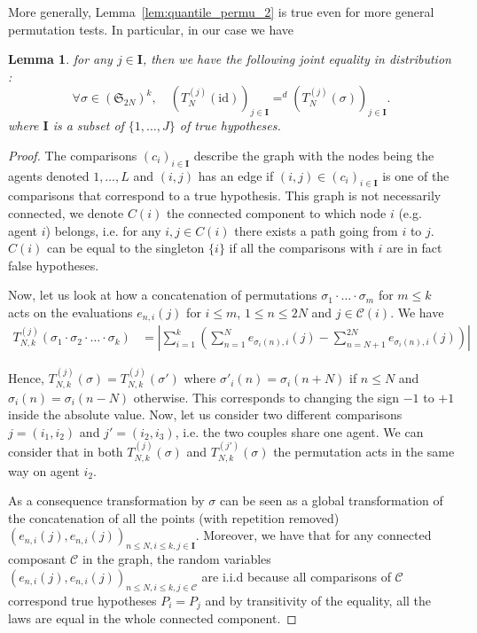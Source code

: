 \documentclass{article}
\theoremstyle{plain}
\newtheorem{Lemma}{Lemma}
\theoremstyle{remark}
\renewcommand{\S}{\mathfrak{S}}
\newcommand{\1}{\mathbbm{1}}
\newcommand{\id}{\mathrm{id}}
\numberwithin{equation}{section}
\begin{document}
More generally, Lemma~\ref{lem:quantile_permu_2} is true even for more general permutation tests. In particular, in our case we have

\begin{Lemma}
for any $j \in \textbf{I}$, then we have the following joint equality in distribution :
$$\forall \sigma \in (\S_{2N})^k, \quad (T_N^{(j)}(\id))_{j \in\textbf{I}} =^d (T_N^{(j)}(\sigma))_{j \in \textbf{I}}.$$
where $\textbf{I}$ is a subset of $\{1,\dots,J\}$ of true hypotheses.
\end{Lemma}
\begin{proof}
The comparisons $(c_i)_{i \in \textbf{I}}$ describe the graph with the nodes being the agents denoted $1,\dots,L$ and $(i,j)$ has an edge if $(i,j)\in(c_i)_{i \in \textbf{I}}$ is one of the comparisons that correspond to a true hypothesis. This graph is not necessarily connected, we denote $C(i)$ the connected component to which node $i$ (e.g. agent $i$) belongs, i.e. for any $i,j \in C(i)$ there exists a path going from $i$ to $j$. $C(i)$ can be equal to the singleton $\{i\}$ if all the comparisons with $i$ are in fact false hypotheses.

Now, let us look at how a concatenation of permutations $\sigma_1\cdot\ldots\cdot\sigma_m$ for $m\le k$ acts on the evaluations $e_{n,i}(j)$ for $i \le m$, $1\le n\le 2N$ and $j \in \mathcal{C}(i)$. We have
\begin{align*}
T_{N,k}^{(j)}(\sigma_1 \cdot  \sigma_2 \cdot  \ldots  \cdot  \sigma_k)&=  \left|\sum_{i=1}^k\left(\sum_{n=1}^{N} e_{\sigma_i(n),i}(j)-\sum_{n=N+1}^{2N} e_{\sigma_i(n),i}(j)\right)\right|
\end{align*}

Hence, $T_{N,k}^{(j)}(\sigma) = T_{N,k}^{(j)}(\sigma')$ where $\sigma'_i(n)=\sigma_i(n+N)$ if $n \le N$ and $\sigma_i(n) = \sigma_i(n-N)$ otherwise. This corresponds to changing the sign $-1$ to $+1$ inside the absolute value. Now, let us consider two different comparisons $j=(i_1,i_2)$ and $j'=(i_2,i_3)$, i.e. the two couples share one agent. We can consider that in both $T_{N,k}^{(j)}(\sigma)$ and $T_{N,k}^{(j')}(\sigma)$ the permutation acts in the same way on agent $i_2$.

As a consequence transformation by $\sigma$ can be seen as a global transformation of the concatenation of all the points (with repetition removed) $(e_{n,i}(j), e_{n,i}(j))_{n\le N, i\le k,j\in \textbf{I}}$. Moreover, we have that for any connected composant $\mathcal{C}$ in the graph, the random variables $(e_{n,i}(j), e_{n,i}(j))_{n\le N, i\le k,j\in \mathcal{C}}$ are i.i.d because all comparisons of $\mathcal{C}$ correspond true hypotheses $P_i = P_j$ and by transitivity of the equality, all the laws are equal in the whole connected component.


\end{proof}
\end{document}

